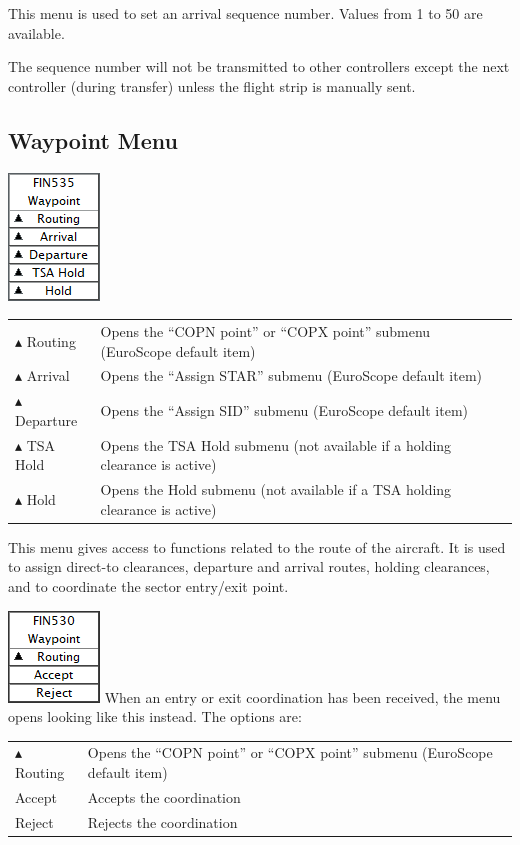 \documentclass[11pt,a4paper]{memoir}
\begin{document}
This menu is used to set an arrival sequence number. Values from 1 to 50 are available.

The sequence number will not be transmitted to other controllers except the next
controller (during transfer) unless the flight strip is manually sent.

\subsection{Waypoint Menu}
\label{menu:wpt}
\includegraphics{img/wpt.png}

\begin{tabular}{l l}
$\blacktriangle$  Routing & Opens the “COPN point” or “COPX point” submenu (EuroScope default item)
\\$\blacktriangle$ Arrival & Opens the “Assign STAR” submenu (EuroScope default item)
\\$\blacktriangle$ Departure & Opens the “Assign SID” submenu (EuroScope default item)
\\$\blacktriangle$ TSA Hold & Opens the TSA Hold submenu (not available if a holding clearance is active)
\\$\blacktriangle$ Hold & Opens the Hold submenu (not available if a TSA holding clearance is active)
\end{tabular}

This menu gives access to functions related to the route of the aircraft. It is used to assign
direct-to clearances, departure and arrival routes, holding clearances, and to coordinate
the sector entry/exit point.

\includegraphics{img/wptyn.png}
When an entry or exit coordination has been received, the menu opens looking like this
instead. The options are:

\begin{tabular}{l l}
$\blacktriangle$ Routing    & Opens the “COPN point” or “COPX point” submenu (EuroScope default item)
\\Accept                      & Accepts the coordination
\\Reject                      & Rejects the coordination
\end{tabular}
\end{document}
